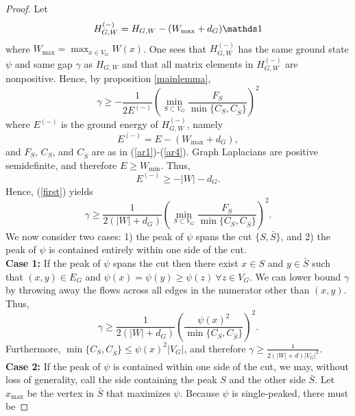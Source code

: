 \noindent
\begin{proof}
Let 
\begin{equation}
    H_{G,W}^{(-)} = H_{G,W} - (W_{\max}+d_G) \id
\end{equation} 
where $W_{\max} = \max_{x \in V_G} W(x)$. One sees that
$H_{G,W}^{(-)}$ has the same ground state $\psi$ and same gap $\gamma$
as $H_{G,W}$ and that all matrix elements in $H_{G,W}^{(-)}$ are
nonpositive. Hence, by 
proposition \ref{mainlemma},
\begin{equation}
\label{first}
\gamma \geq - \frac{1}{2E^{(-)}} \left( \min_{S \subset V_G} \frac{F_S}{\min\{C_S,
    C_{\bar{S}}\}} \right)^2
\end{equation}
where $E^{(-)}$ is the ground energy of $H_{G,W}^{(-)}$, namely
\begin{equation}
E^{(-)} = E - (W_{\max}+d_G),
\end{equation}
and $F_S$, $C_S$, and $C_{\bar{S}}$ are as in
(\ref{ar1})-(\ref{ar4}). Graph Laplacians are positive semidefinite,
and therefore $E \geq W_{\min}$. Thus,
\begin{equation}
E^{(-)} \geq -|W|-d_G.
\end{equation}
Hence, (\ref{first}) yields
\begin{equation}
\label{second}
\gamma \geq \frac{1}{2(|W|+d_G)} \left( \min_{S \subset V_G}
  \frac{F_S}{\min\{C_S, C_{\bar{S}}\}} \right)^2.
\end{equation}
We now consider two cases: 1) the peak of $\psi$ spans the
cut $\{S,\bar{S}\}$, and 2) the peak of $\psi$ is contained entirely
within one side of the cut.\\
\textbf{Case 1:}
If the peak of $\psi$ spans the cut then there exist $x \in S$ and $y
\in \bar{S}$ such that $(x,y) \in E_G$ and $\psi(x) = \psi(y) \geq
\psi(z) \ \forall z \in V_G$. We can lower bound $\gamma$ by throwing
away the flows across all edges in the numerator other than
$(x,y)$. Thus,
\begin{equation}
\gamma \geq \frac{1}{2(|W|+d_G)} \left( \frac{\psi(x)^2}
{\min\{C_{S},C_{\bar{S}}\}} \right)^2.
\end{equation}
Furthermore, $\min\{C_{S},C_{\bar{S}}\} \leq \psi(x)^2 |V_G|$,
and therefore $\gamma \geq \frac{1}{2 (|W|+d) |V_G|^2}$.\\
\textbf{Case 2:}
If the peak of $\psi$ is contained within one side of the cut, we may,
without loss of generality, call the side containing the peak $S$ and
the other side $\bar{S}$. Let $x_{\max}$ be the vertex in $\bar{S}$
that maximizes $\psi$. Because $\psi$ is single-peaked, there must be

\end{proof}

